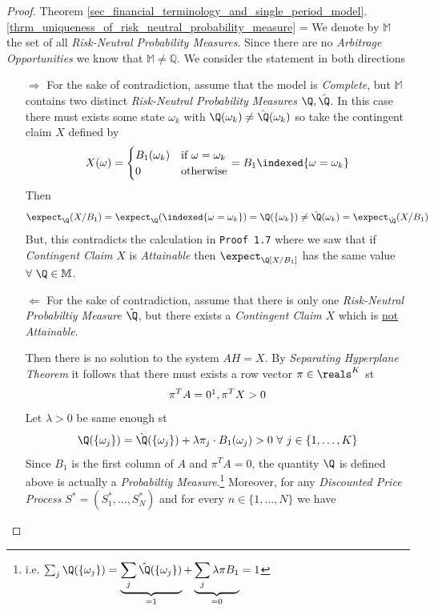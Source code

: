 \documentclass[11pt,a4paper]{article}
\begin{document}
  \begin{proof}{Theorem \ref{sec_financial_terminology_and_single_period_model}.\ref{thrm_uniqueness_of_risk_neutral_probability_measure}}
    \everymath={\displaystyle}
    We denote by $\mathbb{M}$ the set of all \textit{Risk-Neutral Probability Measures}. Since there are no \textit{Arbitrage Opportunities} we know that $\mathbb{M}\neq\mathbb{Q}$.
    We consider the statement in both directions
    \begin{itemize}
      \item[$\Longrightarrow$] For the sake of contradiction, assume that the model is \textit{Complete}, but $\mathbb{M}$ contains two distinct \textit{Risk-Neutral Probability Measures} $\Q,\hat\Q$. In this case there must exists some state $\omega_k$ with $\Q(\omega_k)\neq\hat\Q(\omega_k)$ so take the contingent claim $X$ defined by
      \[ X(\omega)=\begin{cases}B_1(\omega_k)&\text{if }\omega=\omega_k\\0&\text{otherwise}\end{cases}=B_1\indexed\{\omega=\omega_k\} \]
      Then
      \[ \expect_\Q(X/B_1)=\expect_\Q(\indexed\{\omega=\omega_k\})=\Q(\{\omega_k\})\neq\hat\Q(\omega_k)=\expect_{\hat\Q}(X/B_1) \]
      But, this contradicts the calculation in \texttt{Proof 1.7} where we saw that if \textit{Contingent Claim} $X$ is \textit{Attainable} then $\expect_\Q[X/B_1]$ has the same value $\forall\ \Q\in \mathbb{M}$.
      \item[$\Longleftarrow$] For the sake of contradiction, assume that there is only one \textit{Risk-Neutral Probabiltiy Measure} $\hat\Q$, but there exists a \textit{Contingent Claim} $X$ which is \underline{not} \textit{Attainable}.
      \par Then there is no solution to the system $AH=X$. By \textit{Separating Hyperplane Theorem} it follows that there must exists a row vector $\pi\in\reals^K$ st
      \[ \pi^TA=0\footnotemark,\pi^TX>0 \] 
      Let $\lambda>0$ be same enough st
      \[ \Q(\{\omega_j\})=\hat\Q(\{\omega_j\})+\lambda\pi_j\cdot B_1(\omega_j)>0\ \forall\ j\in\{1,\dots,K\} \]
      Since $B_1$ is the first column of $A$ and $\pi^TA=0$, the quantity $\Q$ is defined above is actually a \textit{Probabiltiy Measure}.\footnote{i.e. $\sum_j\Q(\{\omega_j\})=\underbrace{\sum_j\hat\Q(\{\omega_j\})}_{=1}+\underbrace{\sum_j\lambda\pi B_1}_{=0}=1$}
      Moreover, for any \textit{Discounted Price Process} $S^*=(S_1^*,\dots,S_N^*)$ and for every $n\in\{1,\dots,N\}$ we have

\end{itemize}
\end{proof}
\end{document}
